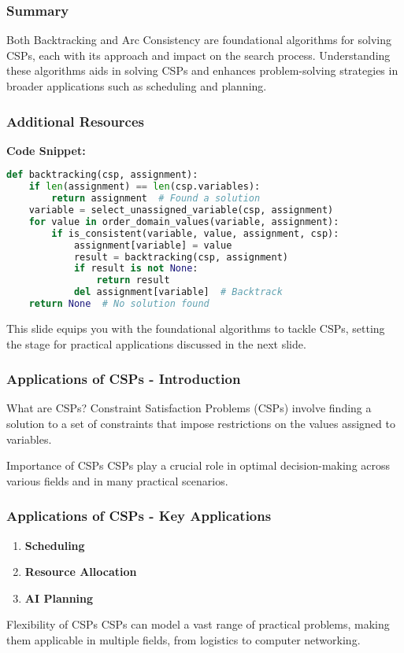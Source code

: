 \documentclass[aspectratio=169]{beamer}
\begin{document}
\begin{frame}[fragile]
    \frametitle{Summary}
    
    Both Backtracking and Arc Consistency are foundational algorithms for solving CSPs, each with its approach and impact on the search process. Understanding these algorithms aids in solving CSPs and enhances problem-solving strategies in broader applications such as scheduling and planning.
\end{frame}

\begin{frame}[fragile]
    \frametitle{Additional Resources}
    
    \textbf{Code Snippet:}
    \begin{lstlisting}[language=Python]
def backtracking(csp, assignment):
    if len(assignment) == len(csp.variables):
        return assignment  # Found a solution
    variable = select_unassigned_variable(csp, assignment)
    for value in order_domain_values(variable, assignment):
        if is_consistent(variable, value, assignment, csp):
            assignment[variable] = value
            result = backtracking(csp, assignment)
            if result is not None:
                return result
            del assignment[variable]  # Backtrack
    return None  # No solution found
    \end{lstlisting}

    This slide equips you with the foundational algorithms to tackle CSPs, setting the stage for practical applications discussed in the next slide.
\end{frame}

\begin{frame}[fragile]
    \frametitle{Applications of CSPs - Introduction}
    \begin{block}{What are CSPs?}
        Constraint Satisfaction Problems (CSPs) involve finding a solution to a set of constraints that impose restrictions on the values assigned to variables.
    \end{block}
    
    \begin{block}{Importance of CSPs}
        CSPs play a crucial role in optimal decision-making across various fields and in many practical scenarios.
    \end{block}
\end{frame}

\begin{frame}[fragile]
    \frametitle{Applications of CSPs - Key Applications}
    \begin{enumerate}
        \item \textbf{Scheduling}
        \item \textbf{Resource Allocation}
        \item \textbf{AI Planning}
    \end{enumerate}
    
    \begin{block}{Flexibility of CSPs}
        CSPs can model a vast range of practical problems, making them applicable in multiple fields, from logistics to computer networking.
    \end{block}
\end{frame}
\end{document}
